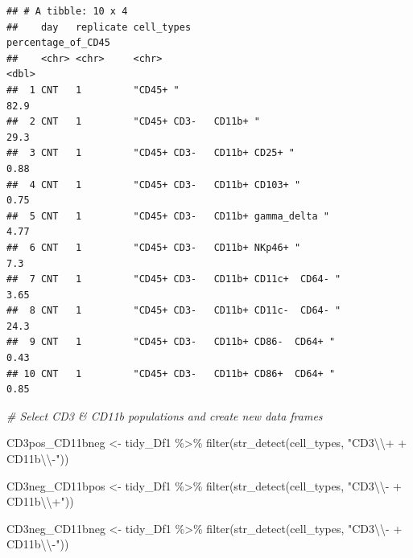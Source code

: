 \documentclass[
]{book}
\newenvironment{Shaded}{\begin{snugshade}}{\end{snugshade}}
\newcommand{\CommentTok}[1]{\textcolor[rgb]{0.56,0.35,0.01}{\textit{#1}}}
\newcommand{\FunctionTok}[1]{\textcolor[rgb]{0.00,0.00,0.00}{#1}}
\newcommand{\NormalTok}[1]{#1}
\newcommand{\OtherTok}[1]{\textcolor[rgb]{0.56,0.35,0.01}{#1}}
\newcommand{\SpecialCharTok}[1]{\textcolor[rgb]{0.00,0.00,0.00}{#1}}
\newcommand{\StringTok}[1]{\textcolor[rgb]{0.31,0.60,0.02}{#1}}
\begin{document}
\begin{verbatim}
## # A tibble: 10 x 4
##    day   replicate cell_types                           percentage_of_CD45
##    <chr> <chr>     <chr>                                             <dbl>
##  1 CNT   1         "CD45+ "                                          82.9 
##  2 CNT   1         "CD45+ CD3-   CD11b+ "                            29.3 
##  3 CNT   1         "CD45+ CD3-   CD11b+ CD25+ "                       0.88
##  4 CNT   1         "CD45+ CD3-   CD11b+ CD103+ "                      0.75
##  5 CNT   1         "CD45+ CD3-   CD11b+ gamma_delta "                 4.77
##  6 CNT   1         "CD45+ CD3-   CD11b+ NKp46+ "                      7.3 
##  7 CNT   1         "CD45+ CD3-   CD11b+ CD11c+  CD64- "               3.65
##  8 CNT   1         "CD45+ CD3-   CD11b+ CD11c-  CD64- "              24.3 
##  9 CNT   1         "CD45+ CD3-   CD11b+ CD86-  CD64+ "                0.43
## 10 CNT   1         "CD45+ CD3-   CD11b+ CD86+  CD64+ "                0.85
\end{verbatim}

\begin{Shaded}
\begin{Highlighting}[]
\CommentTok{\# Select CD3 \& CD11b populations and create new data frames }
 
\NormalTok{CD3pos\_CD11bneg }\OtherTok{\textless{}{-}}\NormalTok{ tidy\_Df1 }\SpecialCharTok{\%\textgreater{}\%}
  \FunctionTok{filter}\NormalTok{(}\FunctionTok{str\_detect}\NormalTok{(cell\_types, }\StringTok{"CD3}\SpecialCharTok{\textbackslash{}\textbackslash{}}\StringTok{+ + CD11b}\SpecialCharTok{\textbackslash{}\textbackslash{}}\StringTok{{-}"}\NormalTok{)) }

\NormalTok{CD3neg\_CD11bpos }\OtherTok{\textless{}{-}}\NormalTok{ tidy\_Df1 }\SpecialCharTok{\%\textgreater{}\%}
  \FunctionTok{filter}\NormalTok{(}\FunctionTok{str\_detect}\NormalTok{(cell\_types, }\StringTok{"CD3}\SpecialCharTok{\textbackslash{}\textbackslash{}}\StringTok{{-} + CD11b}\SpecialCharTok{\textbackslash{}\textbackslash{}}\StringTok{+"}\NormalTok{)) }

\NormalTok{CD3neg\_CD11bneg }\OtherTok{\textless{}{-}}\NormalTok{ tidy\_Df1 }\SpecialCharTok{\%\textgreater{}\%}
  \FunctionTok{filter}\NormalTok{(}\FunctionTok{str\_detect}\NormalTok{(cell\_types, }\StringTok{"CD3}\SpecialCharTok{\textbackslash{}\textbackslash{}}\StringTok{{-} + CD11b}\SpecialCharTok{\textbackslash{}\textbackslash{}}\StringTok{{-}"}\NormalTok{))}
\end{Highlighting}
\end{Shaded}
\end{document}
